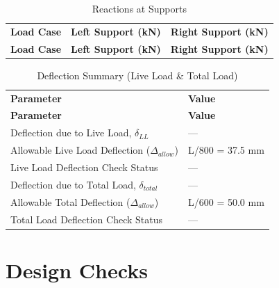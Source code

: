 \documentclass[12pt,a4paper]{report}
\numberwithin{figure}{chapter}
\begin{document}
\begin{longtable}{|C{4.71cm}|C{4.71cm}|C{4.71cm}|}
\caption{Reactions at Supports}\\
\hline
\textbf{Load Case} & \textbf{Left Support (kN)} & \textbf{Right Support (kN)} \\
\hline
\endfirsthead
\hline
\textbf{Load Case} & \textbf{Left Support (kN)} & \textbf{Right Support (kN)} \\
\hline
\endhead

\hline
\end{longtable}

\begin{longtable}{|L{6.58cm}|L{8.0cm}|}
\caption{Deflection Summary (Live Load \& Total Load)}\\
\hline
\textbf{Parameter} & \textbf{Value} \\
\hline
\endfirsthead
\hline
\textbf{Parameter} & \textbf{Value} \\
\hline
\endhead
Deflection due to Live Load, $\delta_{LL}$ & --- \\
\hline
Allowable Live Load Deflection ($\Delta_{allow}$) & L/800 = 37.5 mm \\
\hline
Live Load Deflection Check Status & --- \\
\hline
Deflection due to Total Load, $\delta_{total}$ & --- \\
\hline
Allowable Total Deflection ($\Delta_{allow}$) & L/600 = 50.0 mm \\
\hline
Total Load Deflection Check Status & --- \\
\hline
\end{longtable}

\vspace{1em}
\noindent
\noindent{}
\noindent{}
\noindent{}


\chapter{Design Checks}
\end{document}
